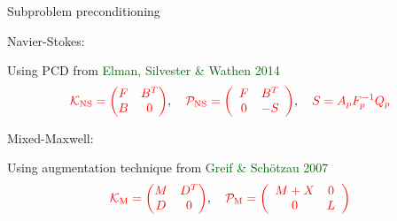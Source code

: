 \documentclass[12pt]{beamer}
\newcommand{\gr}[1]{\textcolor{darkgreen} {#1}}
\newcommand{\re}[1]{{\textcolor{red}       {#1}}}
\begin{document}
\begin{frame}{Subproblem preconditioning}



{\large Navier-Stokes:}

\noindent Using PCD from \gr{Elman, Silvester \& Wathen 2014}
$$\re{\mathcal{K}_{\rm NS}=\begin{pmatrix}
F & B^T \\
B & 0
\end{pmatrix}},\quad \re{\mathcal{P}_{\rm NS}=\left(\begin{array}{cc}
F & B^T \\
0 & -S
\end{array}\right)}, \quad \re{S =A_p F_p^{-1}Q_p}$$

\vspace{5mm}

{\large Mixed-Maxwell:}

\noindent Using augmentation technique from \gr{Greif \& Sch{\"o}tzau 2007}
$$\re{\mathcal{K}_{\rm M}=\begin{pmatrix}
M & D^T \\
D & 0
\end{pmatrix}}, \quad \re{\mathcal{P}_{\rm M}=\left(\begin{array}{cc}
M+X & 0 \\
0 & L
\end{array}\right)}$$

\end{frame}

\end{document}
